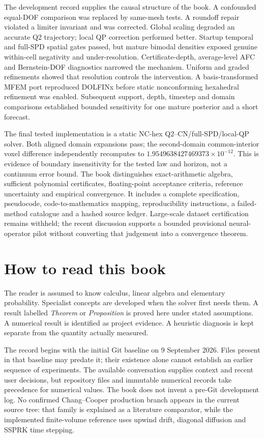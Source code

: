 \documentclass[11pt,oneside]{book}
\theoremstyle{definition}\newtheorem{definition}[theorem]{Definition}\newtheorem{example}[theorem]{Example}
\theoremstyle{remark}\newtheorem{remark}[theorem]{Remark}
\begin{document}
The development record supplies the causal structure of the book. A confounded equal-DOF comparison was replaced by same-mesh tests. A roundoff repair violated a limiter invariant and was corrected. Global scaling degraded an accurate Q2 trajectory; local QP correction performed better. Startup temporal and full-SPD spatial gates passed, but mature bimodal densities exposed genuine within-cell negativity and under-resolution. Certificate-depth, average-level AFC and Bernstein-DOF diagnostics narrowed the mechanism. Uniform and graded refinements showed that resolution controls the intervention. A basis-transformed MFEM port reproduced DOLFINx before static nonconforming hexahedral refinement was enabled. Subsequent support, depth, timestep and domain comparisons established bounded sensitivity for one mature posterior and a short forecast.

The final tested implementation is a static NC-hex Q2--CN/full-SPD/local-QP solver. Both aligned domain expansions pass; the second-domain common-interior voxel difference independently recomputes to $1.9549638427469373\times10^{-12}$. This is evidence of boundary insensitivity for the tested law and horizon, not a continuum error bound. The book distinguishes exact-arithmetic algebra, sufficient polynomial certificates, floating-point acceptance criteria, reference uncertainty and empirical convergence. It includes a complete specification, pseudocode, code-to-mathematics mapping, reproducibility instructions, a failed-method catalogue and a hashed source ledger. Large-scale dataset certification remains withheld; the recent discussion supports a bounded provisional neural-operator pilot without converting that judgement into a convergence theorem.

\chapter*{How to read this book}
The reader is assumed to know calculus, linear algebra and elementary probability. Specialist concepts are developed when the solver first needs them. A result labelled \emph{Theorem} or \emph{Proposition} is proved here under stated assumptions. A numerical result is identified as project evidence. A heuristic diagnosis is kept separate from the quantity actually measured.

The record begins with the initial Git baseline on 9 September 2026. Files present in that baseline may predate it; their existence alone cannot establish an earlier sequence of experiments. The available conversation supplies context and recent user decisions, but repository files and immutable numerical records take precedence for numerical values. The book does not invent a pre-Git development log. No confirmed Chang--Cooper production branch appears in the current source tree: that family is explained as a literature comparator, while the implemented finite-volume reference uses upwind drift, diagonal diffusion and SSPRK time stepping.
\end{document}
